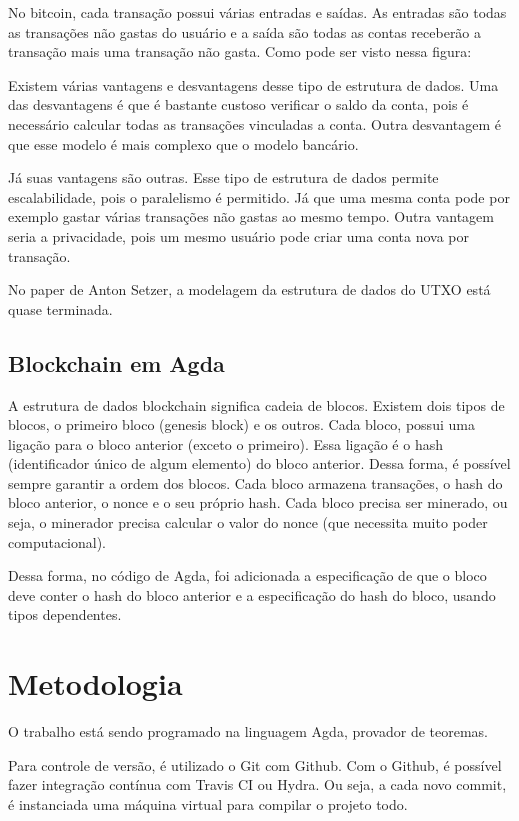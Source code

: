\documentclass[12pt]{article}
\begin{document}
No bitcoin, cada transação possui várias entradas e saídas. As entradas são todas as transações não gastas do usuário e a saída são todas as contas receberão a transação mais uma transação não gasta. Como pode ser visto nessa figura:

Existem várias vantagens e desvantagens desse tipo de estrutura de dados. Uma das desvantagens é que é bastante custoso verificar o saldo da conta, pois é necessário calcular todas as transações vinculadas a conta. Outra desvantagem é que esse modelo é mais complexo que o modelo bancário.

Já suas vantagens são outras. Esse tipo de estrutura de dados permite escalabilidade, pois o paralelismo é permitido. Já que uma mesma conta pode por exemplo gastar várias transações não gastas ao mesmo tempo. Outra vantagem seria a privacidade, pois um mesmo usuário pode criar uma conta nova por transação.

No paper de Anton Setzer, a modelagem da estrutura de dados do UTXO está quase terminada.

\subsection{Blockchain em Agda}

A estrutura de dados blockchain significa cadeia de blocos. Existem dois tipos de blocos, o primeiro bloco (genesis block) e os outros. Cada bloco, possui uma ligação para o bloco anterior (exceto o primeiro).
Essa ligação é o hash (identificador único de algum elemento) do bloco anterior. Dessa forma, é possível sempre garantir a ordem dos blocos. Cada bloco armazena transações, o hash do bloco anterior, o nonce e o seu próprio hash. Cada bloco precisa ser minerado, ou seja, o minerador precisa calcular o valor do nonce (que necessita muito poder computacional).

Dessa forma, no código de Agda, foi adicionada a especificação de que o bloco deve conter o hash do bloco anterior e a especificação do hash do bloco, usando tipos dependentes.

\section{Metodologia}

O trabalho está sendo programado na linguagem Agda, provador de teoremas. 

Para controle de versão, é utilizado o Git com Github.
Com o Github, é possível fazer integração contínua com Travis CI ou Hydra.
Ou seja, a cada novo commit, é instanciada uma máquina virtual para compilar o projeto todo.
\end{document}
